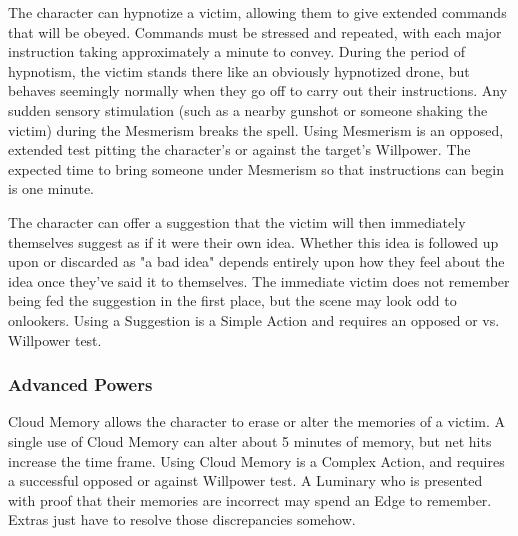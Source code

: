  The character can hypnotize a victim, allowing them to give extended commands that will be obeyed. Commands must be stressed and repeated, with each major instruction taking approximately a minute to convey. During the period of hypnotism, the victim stands there like an obviously hypnotized drone, but behaves seemingly normally when they go off to carry out their instructions. Any sudden sensory stimulation (such as a nearby gunshot or someone shaking the victim) during the Mesmerism breaks the spell. Using Mesmerism is an opposed, extended test pitting the character's  or  against the target's Willpower. The expected time to bring someone under Mesmerism so that instructions can begin is one minute.

 The character can offer a suggestion that the victim will then immediately themselves suggest as if it were their own idea. Whether this idea is followed up upon or discarded as "a bad idea" depends entirely upon how they feel about the idea once they've said it to themselves. The immediate victim does not remember being fed the suggestion in the first place, but the scene may look odd to onlookers. Using a Suggestion is a Simple Action and requires an opposed  or  vs. Willpower test.

\subsubsection{Advanced Powers}

 Cloud Memory allows the character to erase or alter the memories of a victim. A single use of Cloud Memory can alter about 5 minutes of memory, but net hits increase the time frame. Using Cloud Memory is a Complex Action, and requires a successful opposed  or  against Willpower test. A Luminary who is presented with proof that their memories are incorrect may spend an Edge to remember. Extras just have to resolve those discrepancies somehow.

